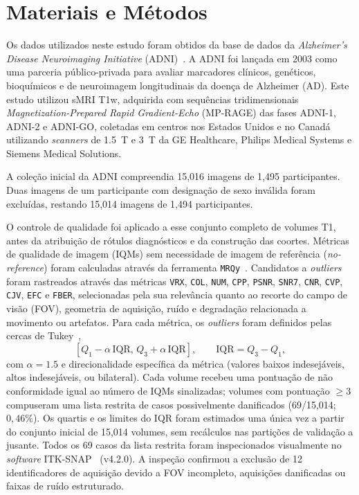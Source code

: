 \documentclass[review]{elsarticle}
\newcommand{\code}[1]{\texttt{#1}}
\begin{document}
\section{Materiais e Métodos}\label{sec:Material-and-Methods}

Os dados utilizados neste estudo foram obtidos da base de dados da \emph{Alzheimer's Disease Neuroimaging Initiative} (ADNI)~\cite{petersen-2009,jr-2008}. A ADNI foi lançada em 2003 como uma parceria público-privada para avaliar marcadores clínicos, genéticos, bioquímicos e de neuroimagem longitudinais da doença de Alzheimer (AD). Este estudo utilizou sMRI T1w, adquirida com sequências tridimensionais \emph{Magnetization-Prepared Rapid Gradient-Echo} (MP-RAGE) das fases ADNI-1, ADNI-2 e ADNI-GO, coletadas em centros nos Estados Unidos e no Canadá utilizando \textit{scanners} de 1.5~T e 3~T da GE Healthcare, Philips Medical Systems e Siemens Medical Solutions.

A coleção inicial da ADNI compreendia 15{,}016 imagens de 1{,}495 participantes. Duas imagens de um participante com designação de sexo inválida foram excluídas, restando 15{,}014 imagens de 1{,}494 participantes.

O controle de qualidade foi aplicado a esse conjunto completo de volumes T1, antes da atribuição de rótulos diagnósticos e da construção das coortes. Métricas de qualidade de imagem (IQMs) sem necessidade de imagem de referência (\emph{no-reference}) foram calculadas através da ferramenta \code{MRQy}~\citep{sadri-2020}. Candidatos a \textit{outliers} foram rastreados através das métricas \code{VRX}, \code{COL}, \code{NUM}, \code{CPP}, \code{PSNR}, \code{SNR7}, \code{CNR}, \code{CVP}, \code{CJV}, \code{EFC} e \code{FBER}, selecionadas pela sua relevância quanto ao recorte do campo de visão (FOV), geometria de aquisição, ruído e degradação relacionada a movimento ou artefatos. Para cada métrica, os \textit{outliers} foram definidos pelas cercas de Tukey~\citep{tukey-1977},
\begin{equation}
	\left[Q_1 - \alpha\,\mathrm{IQR},\, Q_3 + \alpha\,\mathrm{IQR}\right],
	\qquad \mathrm{IQR} = Q_3 - Q_1,
	\label{eq:tukey}
\end{equation}	
com $\alpha = 1.5$ e direcionalidade específica da métrica (valores baixos indesejáveis, altos indesejáveis, ou bilateral). Cada volume recebeu uma pontuação de não conformidade igual ao número de IQMs sinalizadas; volumes com pontuação $\geq 3$ compuseram uma lista restrita de casos possivelmente danificados (69/15{,}014; $0{,}46\%$). Os quartis e os limites do IQR foram estimados uma única vez a partir do conjunto inicial de 15{,}014 volumes, sem recálculos nas partições de validação a jusante. Todos os 69 casos da lista restrita foram inspecionados visualmente no \textit{software} ITK-SNAP~\citep{yushkevich-2006} (v4.2.0). A inspeção confirmou a exclusão de 12 identificadores de aquisição devido a FOV incompleto, aquisições danificadas ou faixas de ruído estruturado.
\end{document}
